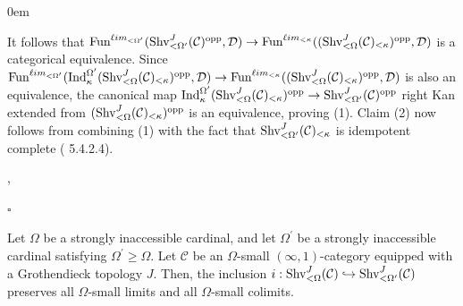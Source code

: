 \documentclass[10pt]{article}
\newcommand{\C}{\mathcal C}
\newcommand{\cD}{\mathcal{D}}
\renewcommand{\qed}{\hfill$\square$}
\renewenvironment{proof}{\begin{addmargin}[1em]{0em}\begin{newproof}}{\end{newproof}\end{addmargin}\qed}
\theoremstyle{witharg}
\theoremstyle{witharg}
\theoremstyle{witharg2}
\begin{document}
\begin{proof}
    \noindent It follows that $\textnormal{Fun}^{\ell im_{<\Omega^\prime}}(\textnormal{Shv}^J_{<\Omega^\prime}(\C)^{\textnormal{opp}},\cD)\rightarrow \textnormal{Fun}^{\ell im_{<\kappa}}((\textnormal{Shv}_{<\Omega}^J(\C)_{<\kappa})^{\textnormal{opp}},\cD)$ is a categorical equivalence. Since $\textnormal{Fun}^{\ell im_{<\Omega^\prime}}(\textnormal{Ind}_\kappa^{\Omega^\prime}(\textnormal{Shv}^J_{<\Omega}(\C)_{<\kappa})^{\textnormal{opp}},\cD)\rightarrow \textnormal{Fun}^{\ell im_{<\kappa}}((\textnormal{Shv}_{<\Omega}^J(\C)_{<\kappa})^{\textnormal{opp}},\cD)$ is also an equivalence, the canonical map $\textnormal{Ind}_\kappa^{\Omega^\prime}(\textnormal{Shv}^J_{<\Omega}(\C)_{<\kappa})^{\textnormal{opp}}\rightarrow \textnormal{Shv}^J_{<\Omega^\prime}(\C)^{\textnormal{opp}}$ right Kan extended from $(\textnormal{Shv}^J_{<\Omega}(\C)_{<\kappa})^{\textnormal{opp}}$ is an equivalence, proving (1). Claim (2) now follows from combining (1) with the fact that $\textnormal{Shv}^J_{<\Omega^\prime}(\C)_{<\kappa}$ is idempotent complete ( 5.4.2.4). 


    
    
   , 



    
\end{proof}


\begin{lemma}{}\label{Small Sheaves are stable under small limits}

    Let $\Omega$ be a strongly inaccessible cardinal, and let $\Omega^\prime$ be a strongly inaccessible cardinal satisfying $\Omega^\prime\geq \Omega$. Let $\C$ be an $\Omega$-small $(\infty,1)$-category equipped with a Grothendieck topology $J$. Then, the inclusion $i:\textnormal{Shv}^J_{<\Omega}(\C)\hookrightarrow \textnormal{Shv}^J_{<\Omega^\prime}(\C)$ preserves all $\Omega$-small limits and all $\Omega$-small colimits.
    
\end{lemma}
\end{document}
